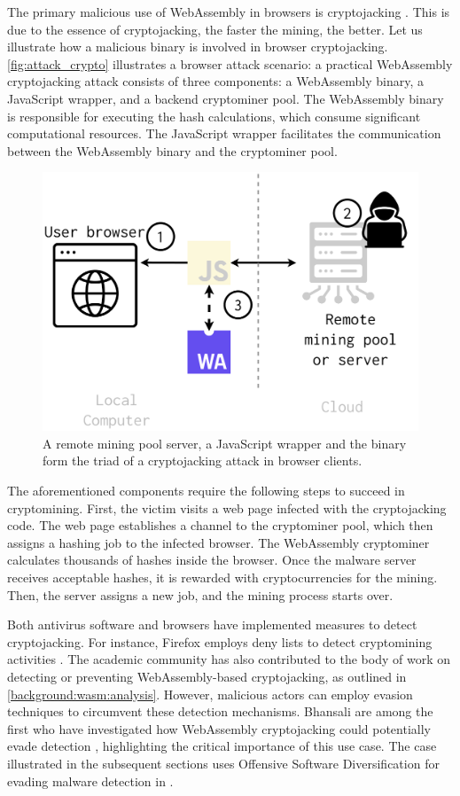 \label{offensive_app}

The primary malicious use of WebAssembly in browsers is cryptojacking \cite{musch2019new}. 
This is due to the essence of cryptojacking, the faster the mining, the better. 
Let us illustrate how a malicious \Wasm binary is involved in browser cryptojacking.
\autoref{fig:attack_crypto} illustrates a browser attack scenario:
a practical WebAssembly cryptojacking attack consists of three components: a WebAssembly binary, a JavaScript wrapper, and a backend cryptominer pool. 
The WebAssembly binary is responsible for executing the hash calculations, which consume significant computational resources. 
The JavaScript wrapper facilitates the communication between the WebAssembly binary and the cryptominer pool.

\begin{figure}[h]
    \centering
    \includegraphics[width=0.6\linewidth]{figures/attack_crypto.pdf}
    \caption{A remote mining pool server, a JavaScript wrapper and the \Wasm binary form the triad of a cryptojacking attack in browser clients.}
    \label{fig:attack_crypto}
\end{figure}

The aforementioned components require the following steps to succeed in cryptomining.
First, the victim visits a web page infected with the cryptojacking code. 
The web page establishes a channel to the cryptominer pool, which then assigns a hashing job to the infected browser. 
The WebAssembly cryptominer calculates thousands of hashes inside the browser. 
Once the malware server receives acceptable hashes, it is rewarded with cryptocurrencies for the mining. 
Then, the server assigns a new job, and the mining process starts over.

Both antivirus software and browsers have implemented measures to detect cryptojacking. For instance, Firefox employs deny lists to detect cryptomining activities \cite{firefoxcrypto}. 
The academic community has also contributed to the body of work on detecting or preventing WebAssembly-based cryptojacking, as outlined in \autoref{background:wasm:analysis}. 
However, malicious actors can employ evasion techniques to circumvent these detection mechanisms. 
Bhansali \etal are among the first who have investigated how WebAssembly cryptojacking could potentially evade detection \cite{10.1145/3507657.3528560}, highlighting the critical importance of this use case. 
The case illustrated in the subsequent sections uses Offensive Software Diversification for evading malware detection in \Wasm. 

